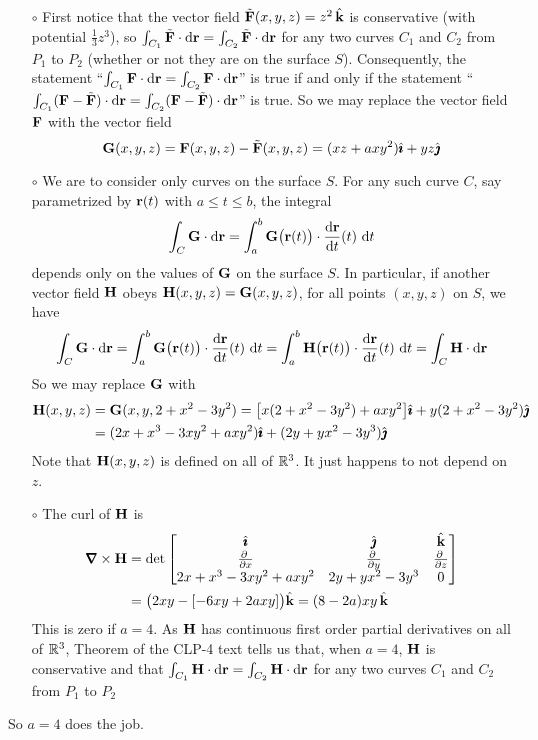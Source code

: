 \begin{solution} 
\begin{itemize}\itemsep1pt \parskip0pt  %
\item[$\circ$]
First notice that the vector field $\tilde{\mathbf{F}}(x,y,z) = z^2\,\hat{\mathbf{k}}$ is 
conservative (with potential $\frac{1}{3} z^3$), so 
$\int_{C_1} \tilde{\mathbf{F}} \cdot \mathrm{d}\mathbf{r}= \int_{C_2} \tilde{\mathbf{F}} \cdot \mathrm{d}\mathbf{r}$
for any two curves $C_1$ and $C_2$ from $P_1$ to $P_2$ (whether or not they are on the surface $S$). Consequently, the statement
``$\int_{C_1} \mathbf{F} \cdot \mathrm{d}\mathbf{r}= \int_{C_2} \mathbf{F} \cdot \mathrm{d}\mathbf{r}$''
is true  if and only if the statement
``$\int_{C_1} (\mathbf{F}-\tilde{\mathbf{F}}) \cdot \mathrm{d}\mathbf{r}= \int_{C_2} (\mathbf{F}-\tilde{\mathbf{F}}) \cdot \mathrm{d}\mathbf{r}$'' is true.
So we may replace the vector field $\mathbf{F}$
with the vector field 
\begin{equation*}
\mathbf{G}(x,y,z)=\mathbf{F}(x,y,z)-\tilde{\mathbf{F}}(x,y,z)=( xz + axy^2 )\hat{\pmb{\imath}} + yz\hat{\pmb{\jmath}}
\end{equation*}
\item[$\circ$]
We are to consider only curves on the surface $S$.
For any such curve $C$, say parametrized by $\mathbf{r}(t)$ with $a\le t\le b$, the
integral 
\begin{equation*}
\int_C \vG \cdot \dee{\vr}
=\int_a^b \vG\big(\vr(t)\big)\cdot \diff{\vr}{t}(t)\ \dee{t}
\end{equation*} 
depends only on the values of $\mathbf{G}$ on the surface $S$. 
In particular, if another vector field $\mathbf{H}$ obeys $\mathbf{H}(x,y,z)=\mathbf{G}(x,y,z)$,
for all points $(x,y,z)$ on $S$, we have
\begin{align*}
\int_C \vG \cdot \dee{\vr}
=\int_a^b \vG\big(\vr(t)\big)\cdot \diff{\vr}{t}(t)\ \dee{t}
=\int_a^b \vH\big(\vr(t)\big)\cdot \diff{\vr}{t}(t)\ \dee{t}
=\int_C \vH \cdot \dee{\vr}
\end{align*}
So we may replace $\mathbf{G}$ with
\begin{align*}
\mathbf{H}(x,y,z) &= \mathbf{G}(x,y,2+x^2-3y^2)
  = \big[x(2+x^2-3y^2) +axy^2\big]\hat{\pmb{\imath}} +y(2+x^2-3y^2)\hat{\pmb{\jmath}}  \\
  &= (2x+x^3 -3xy^2 +axy^2)\hat{\pmb{\imath}} +(2y+yx^2-3y^3)\hat{\pmb{\jmath}}
\end{align*}
Note that $\mathbf{H}(x,y,z)$ is defined on all of $\mathbb{R}^3$. It just happens
to not depend on $z$.

\item[$\circ$] The curl of $\mathbf{H}$ is
\begin{align*}
\vnabla\times\vH
&=\det\left[\begin{matrix}
\hi &\hj &\hk \\
\pdiff{}{x} & \pdiff{}{y} & 
                \pdiff{}{z} \\
2x+x^3 -3xy^2 +axy^2 & 2y+yx^2-3y^3 & 0
\end{matrix}
\right] \\
&=\big(2xy -[-6xy +2axy]\big)\hk
=(8-2a)xy\,\hk
\end{align*}
This is zero if $a=4$. As $\mathbf{H}$ has continuous first order partial derivatives on all of $\mathbb{R}^3$, Theorem  of the CLP-4 text tells us that, when $a=4$, $\mathbf{H}$ is conservative and that
$\int_{C_1} \mathbf{H} \cdot \mathrm{d}\mathbf{r}= \int_{C_2} \mathbf{H} \cdot \mathrm{d}\mathbf{r}$
for any two curves $C_1$ and $C_2$ from $P_1$ to $P_2$
\end{itemize} 
So $a=4$ does the job.


\end{solution}
